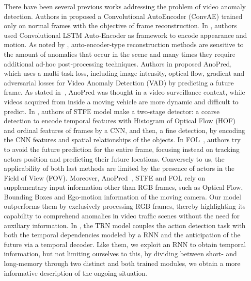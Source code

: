 There have been several previous works addressing the problem of video anomaly detection.
Authors in \cite{hasan2016learning} proposed a Convolutional AutoEncoder (ConvAE) trained only on normal frames with the objective of frame reconstruction.
In \cite{luo2017remembering,wang2018abnormal}, authors used Convolutional LSTM Auto-Encoder as framework to encode appearance and motion.
As noted by \cite{ramachandra2020survey}, auto-encoder-type reconstruction methods are sensitive to the amount of anomalies that occur in the scene and many times they require additional ad-hoc post-processing techniques.
Authors in \cite{liu2018future} proposed AnoPred, which uses a multi-task loss, including image intensity, optical flow, gradient and adversarial losses for Video Anomaly Detection (VAD) by predicting a future frame.
As stated in~\cite{9712446}, AnoPred was thought in a video surveillance context, while videos acquired from inside a moving vehicle are more dynamic and difficult to predict.
In \cite{zhou_spatio-temporal_2022}, authors of STFE model make a two-stage detector: a coarse detection to encode temporal features with Histogram of Optical Flow (HOF) \cite{wang2013action} and ordinal features of frames by a CNN, and then, a fine detection, by encoding the CNN features and spatial relationships of the objects.
In FOL~\cite{9712446}, authors try to avoid the future prediction for the entire frame, focusing instead on tracking actors position and predicting their future locations.
Conversely to us, the applicability of both last methods are limited by the presence of actors in the Field of View (FOV).
Moreover, AnoPred~\cite{liu2018future}, STFE \cite{zhou_spatio-temporal_2022} and FOL \cite{9712446} rely on supplementary input information other than RGB frames, such as Optical Flow, Bounding Boxes and Ego-motion information of the moving camera.
Our model outperforms them by exclusively processing RGB frames, thereby highlighting its capability to comprehend anomalies in video traffic scenes without the need for auxiliary information.
In \cite{xu2019temporal}, the TRN model couples the action detection task with both the temporal dependencies modeled by a RNN and the anticipation of the future via a temporal decoder.
Like them, we exploit an RNN to obtain temporal information, but not limiting ourselves to this, by dividing between short- and long-memory through two distinct and both trained modules, we obtain a more informative description of the ongoing situation.
